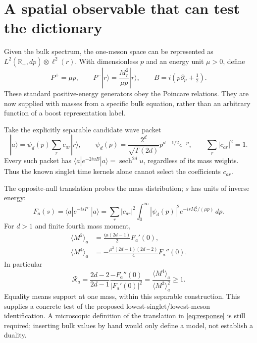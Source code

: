 \documentclass[11pt,a4paper]{article}
\DeclareMathOperator{\sech}{sech}
\begin{document}
\newpage
\section{A spatial observable that can test the dictionary}
Given the bulk spectrum, the one-meson space can be represented as
$L^2(\mathbb R_+,dp)\otimes\ell^2(r)$. With dimensionless $p$ and an
energy unit $\mu>0$, define
\begin{equation}
 P^+=\mu p,\qquad P^-|r\rangle=\frac{M_r^2}{\mu p}|r\rangle,
 \qquad B=i(p\partial_p+\tfrac12).
\end{equation}
These standard positive-energy generators obey the Poincare relations.
They are now supplied with masses from a specific bulk equation, rather
than an arbitrary function of a boost representation label.

Take the explicitly separable candidate wave packet
\begin{equation}
 |a\rangle=\psi_d(p)\sum_r c_{ar}|r\rangle,\qquad
 \psi_d(p)=\frac{2^d}{\sqrt{\Gamma(2d)}}p^{d-1/2}e^{-p},\qquad
 \sum_r|c_{ar}|^2=1.
\end{equation}
Every such packet has
$\langle a|e^{-2iuB}|a\rangle=\sech^{2d}u$, regardless of its mass
weights. Thus the known singlet time kernels alone cannot select the
coefficients $c_{ar}$.

The opposite-null translation probes the mass distribution; $s$ has
units of inverse energy:
\begin{equation}
 F_a(s)=\langle a|e^{-isP^-}|a\rangle
 =\sum_r|c_{ar}|^2\int_0^\infty |\psi_d(p)|^2
                 e^{-isM_r^2/(\mu p)}\,dp.\label{eq:response}
\end{equation}
For $d>1$ and finite fourth mass moment,
\begin{align}
 \langle M^2\rangle_a&=\frac{i\mu(2d-1)}2F_a'(0),\\
 \langle M^4\rangle_a&=-\frac{\mu^2(2d-1)(2d-2)}4F_a''(0).
\end{align}
In particular
\begin{equation}
 \boxed{\mathcal R_a=\frac{2d-2}{2d-1}
              \frac{-F_a''(0)}{|F_a'(0)|^2}
       =\frac{\langle M^4\rangle_a}{\langle M^2\rangle_a^2}\ge1.}
\end{equation}
Equality means support at one mass, within this separable construction.
This supplies a concrete test of the proposed lowest-singlet/lowest-meson
identification. A microscopic definition of the translation in
\eqref{eq:response} is still required; inserting bulk values by hand
would only define a model, not establish a duality.
\end{document}
